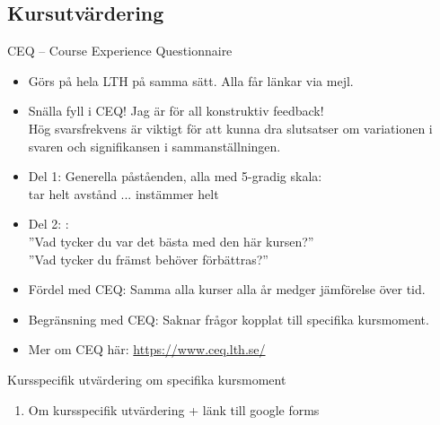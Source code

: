 \documentclass{lecturenotes}
\begin{document}
\subsection{Kursutvärdering}
\begin{Slide}{CEQ -- Course Experience Questionnaire}\footnotesize
\begin{itemize}
\item Görs på hela LTH på samma sätt. Alla får länkar via mejl.
\item Snälla fyll i CEQ! Jag är  för all konstruktiv feedback! \\ Hög svarsfrekvens är viktigt för att kunna dra slutsatser om variationen i svaren och signifikansen i sammanställningen.
\item Del 1: Generella påståenden, alla med 5-gradig skala: \\ tar helt avstånd ... instämmer helt
\item Del 2: : \\
''Vad  tycker  du  var  det  bästa  med  den här  kursen?'' \\
''Vad  tycker  du  främst  behöver  förbättras?''
\item Fördel med CEQ: Samma alla kurser alla år medger jämförelse över tid.
\item Begränsning med CEQ: Saknar frågor kopplat till specifika kursmoment.
\item Mer om CEQ här: \url{https://www.ceq.lth.se/}
\end{itemize}
\end{Slide}

\begin{Slide}{Kursspecifik utvärdering om specifika kursmoment}
\begin{enumerate}
\item Om kursspecifik utvärdering + länk till google forms
\end{enumerate}
\end{Slide}
\end{document}
